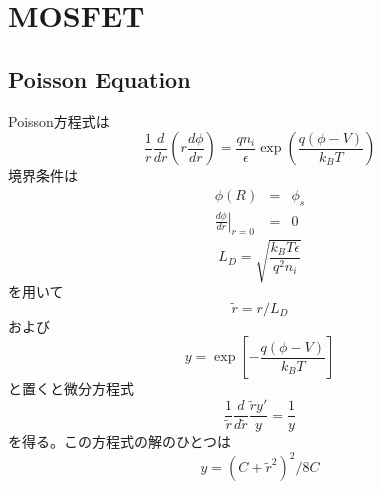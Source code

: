\documentclass[11pt,uplatex]{jsarticle}
\def\d#1#2{\frac{d #1}{d #2}}
\begin{document}
\section{MOSFET}
\subsection{Poisson Equation}
Poisson方程式は
\begin{equation}
 \frac{1}{r} \d{}{r}(r\d{\phi}{r}) =  \frac{q n_i}{\epsilon} \exp\left(\frac{q(\phi-V)}{k_B T}\right)
\end{equation}
境界条件は
\begin{eqnarray}
 \phi(R)&=&\phi_s \\
\left. \d{\phi}{r}\right|_{r=0}&=&0
 \end{eqnarray}
\begin{equation}
 L_D = \sqrt{\frac{k_B T \epsilon}{q^2 n_i}}
\end{equation}
を用いて
\begin{equation}
\tilde{r}=r/L_D
\end{equation}
および
\begin{equation}
 y=\exp\left[ -\frac{q(\phi-V)}{k_B T} \right]
\end{equation}
と置くと微分方程式
\begin{equation}
\frac{1}{\tilde{r}} \d{}{\tilde{r}}\frac{\tilde{r}y'}{y} = \frac{1}{y}
\end{equation}
を得る。この方程式の解のひとつは
\begin{equation}
 y=(C + \tilde{r}^2)^2/8C
\end{equation}
\end{document}
